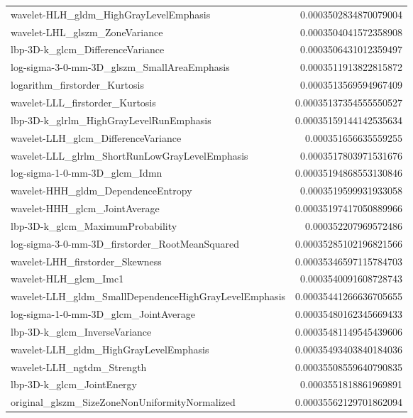 {\begin{xltabular}[H]{\textwidth}{X r}
        wavelet-HLH\_gldm\_HighGrayLevelEmphasis & 0.0003502834870079004 \\
        wavelet-LHL\_glszm\_ZoneVariance & 0.0003504041572358908 \\
        lbp-3D-k\_glcm\_DifferenceVariance & 0.0003506431012359497 \\
        log-sigma-3-0-mm-3D\_glszm\_SmallAreaEmphasis & 0.0003511913822815872 \\
        logarithm\_firstorder\_Kurtosis & 0.0003513569594967409 \\
        wavelet-LLL\_firstorder\_Kurtosis & 0.00035137354555550527 \\
        lbp-3D-k\_glrlm\_HighGrayLevelRunEmphasis & 0.00035159144142535634 \\
        wavelet-LLH\_glcm\_DifferenceVariance & 0.000351656635559255 \\
        wavelet-LLL\_glrlm\_ShortRunLowGrayLevelEmphasis & 0.0003517803971531676 \\
        log-sigma-1-0-mm-3D\_glcm\_Idmn & 0.00035194868553130846 \\
        wavelet-HHH\_gldm\_DependenceEntropy & 0.0003519599931933058 \\
        wavelet-HHH\_glcm\_JointAverage & 0.00035197417050889966 \\
        lbp-3D-k\_glcm\_MaximumProbability & 0.000352207969572486 \\
        log-sigma-3-0-mm-3D\_firstorder\_RootMeanSquared & 0.00035285102196821566 \\
        wavelet-LHH\_firstorder\_Skewness & 0.00035346597115784703 \\
        wavelet-HLH\_glcm\_Imc1 & 0.0003540091608728743 \\
        wavelet-LLH\_gldm\_SmallDependenceHighGrayLevelEmphasis & 0.00035441266636705655 \\
        log-sigma-1-0-mm-3D\_glcm\_JointAverage & 0.00035480162345669433 \\
        lbp-3D-k\_glcm\_InverseVariance & 0.00035481149545439606 \\
        wavelet-LLH\_gldm\_HighGrayLevelEmphasis & 0.00035493403840184036 \\
        wavelet-LLH\_ngtdm\_Strength & 0.00035508559640790835 \\
        lbp-3D-k\_glcm\_JointEnergy & 0.0003551818861969891 \\
        original\_glszm\_SizeZoneNonUniformityNormalized & 0.00035562129701862094 \\

\end{xltabular}}
